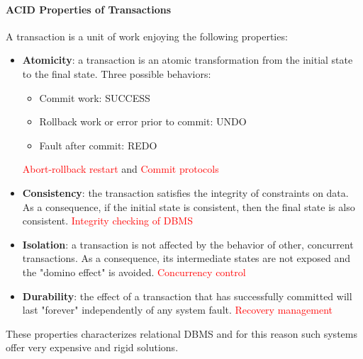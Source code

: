 \documentclass[10pt,a4paper]{article}
\begin{document}
\paragraph{ACID Properties of Transactions}
A transaction is a unit of work enjoying the following properties:
\begin{itemize}
	\item \textbf{Atomicity}: a transaction is an atomic transformation from the initial state to the final state. Three possible behaviors:
	\begin{itemize}
		\item Commit work: SUCCESS
		\item Rollback work or error prior to commit: UNDO
		\item Fault after commit: REDO
	\end{itemize}
	\textcolor{red}{Abort-rollback restart} and \textcolor{red}{Commit protocols}
	\item \textbf{Consistency}: the transaction satisfies the integrity of constraints on data. As a consequence, if the initial state is consistent, then the final state is also consistent. \textcolor{red}{Integrity checking of DBMS}
	\item \textbf{Isolation}: a transaction is not affected by the behavior of other, concurrent transactions. As a consequence, its intermediate states are not exposed and the "domino effect" is avoided. \textcolor{red}{Concurrency control}
	\item \textbf{Durability}: the effect of a transaction that has successfully committed will last "forever" independently of any system fault. \textcolor{red}{Recovery management}
\end{itemize}
These properties characterizes relational DBMS and for this reason such systems offer very expensive and rigid solutions.
\end{document}
